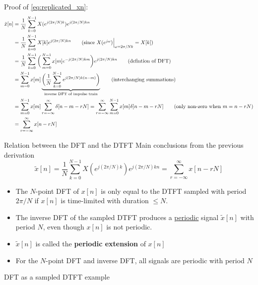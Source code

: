 \documentclass[10pt]{beamer}
\begin{document}
%
\begin{frame}

Proof of \eqref{eq:replicated_xn}:
\begin{align*}
	\tilde{x}[n] &= \frac{1}{N}\sum_{k=0}^{N-1}X(e^{j(2\pi/N)k})e^{j(2\pi/N)kn} \\
	&= \frac{1}{N}\sum_{k=0}^{N-1}X[k]e^{j(2\pi/N)kn} \tag{since $X(e^{j\omega})\Big|_{\omega = 2\pi/Nk} = X[k]$} \\
	&= \frac{1}{N}\sum_{k=0}^{N-1}\bigg(\sum_{m=0}^{N-1}x[m]e^{-j(2\pi/N)km}\bigg)e^{j(2\pi/N)kn} \tag{defintion of DFT} \\
	&= \sum_{m=0}^{N-1}x[m]\underbrace{\bigg(\frac{1}{N}\sum_{k=0}^{N-1}e^{j(2\pi/N)k(n-m)}\bigg)}_{\text{inverse DFT of impulse train}} \tag{interchanging summations} \\
	&= \sum_{m=0}^{N-1}x[m]\sum_{r=-\infty}^{\infty}\delta[n-m-rN] = \sum_{r=-\infty}^{\infty}\sum_{m=0}^{N-1}x[m]\delta[n-m-rN] \tag{only non-zero when $m = n-rN$}\\
	&= \sum_{r=-\infty}^{\infty}x[n-rN]
\end{align*}
\end{frame}

%
\begin{frame}{Relation between the DFT and the DTFT}
	Main conclusions from the previous derivation
	\begin{equation*} 
	\tilde{x}[n] = \frac{1}{N}\sum_{k=0}^{N-1}X(e^{j(2\pi/N)k})e^{j(2\pi/N)kn} = \sum_{r=-\infty}^{\infty} x[n-rN]
	\end{equation*}
	
	\begin{itemize}
		\item The $N$-point DFT of $x[n]$ is only equal to the DTFT sampled with period $2\pi/N$ if $x[n]$ is time-limited with duration $\leq N$.  
		\item The inverse DFT of the sampled DTFT produces a \underline{periodic} signal $\tilde{x}[n]$ with period $N$, even though $x[n]$ is not periodic.
		\item $\tilde{x}[n]$ is called the \textbf{periodic extension} of $x[n]$
		\item For the $N$-point DFT and inverse DFT, all signals are periodic with period $N$
	\end{itemize}
\end{frame}

%
\begin{frame}{DFT as a sampled DTFT example}
\vspace{-0.25cm}
\begin{center}
	\def\N{3}
	\def\Ns{8}
	\resizebox{\linewidth}{!}{}
\end{center}
\end{frame}
\end{document}
